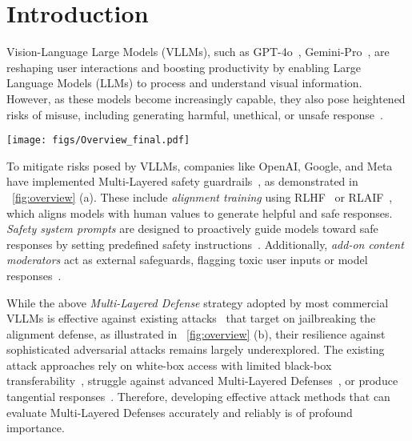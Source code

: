 \section{Introduction}
\label{sec:intro}
Vision-Language Large Models (VLLMs), such as GPT-4o~\cite{openai2024gpt4ocard}, Gemini-Pro~\cite{gemini}, are reshaping user interactions and boosting productivity by enabling Large Language Models (LLMs) to process and understand visual information. However, as these models become increasingly capable, they also pose heightened risks of misuse, including generating harmful, unethical, or unsafe response~\cite{zhao_evaluating_2023, qi2023visual, gong2023figstep, teng2025heuristicinducedmultimodalriskdistribution, gou2024eyes, zhang2024benchmarking}.
\begin{figure*}[tbp]
    \centering
    \texttt{[image: figs/Overview\_final.pdf]}
    \vspace{-20pt}
    \caption{Overview of \textbf{\mfa}. \textbf{(a)} Multi-Layered Defense strategies employed in VLLMs to enhance safety. \textbf{(b)} Existing attacks (\eg, textual attack~\cite{gcg} and visual jailbreaking image~\cite{qi2023visual}) can breach a single defense layer but fail against multi-layered defenses. \textbf{(c)} Our three attack facets work together break the guardrails and contribute to each others successfully, generating high-quality and genuinely harmful responses.}\vspace{-10pt}
    \label{fig:overview}
\end{figure*}
To mitigate risks posed by VLLMs, companies like OpenAI, Google, and Meta have implemented Multi-Layered safety guardrails~\cite{geminiteam2024geminifamilyhighlycapable, openai2024gpt4ocard, grattafiori2024llama3herdmodels}, as demonstrated in ~\cref{fig:overview} (a). These include \textit{alignment training} using RLHF~\citep{stiennon2020learning, ouyang2022training} or RLAIF~\citep{bai2022constitutional}, which aligns models with human values to generate helpful and safe responses. \textit{Safety system prompts} are designed to proactively guide models toward safe responses by setting predefined safety instructions~\citep{LLAMA2, LLAMA}. Additionally, \textit{add-on content moderators} act as external safeguards, flagging toxic user inputs or model responses~\citep{safety_checker, ShieldGemma, llamaguard1, llamaguard2, llamaguard3, openai_moderation}. 

While the above \textit{Multi-Layered Defense} strategy adopted by most commercial VLLMs is effective against existing attacks~\cite{gcg, qi2023visual} that target on jailbreaking the alignment defense, as illustrated in ~\cref{fig:overview} (b), their resilience against sophisticated adversarial attacks remains largely underexplored. The existing attack approaches rely on white-box access with limited black-box transferability~\cite{qi2023visual}, struggle against advanced Multi-Layered Defenses~\cite{gcg, qi2023visual, gong2023figstep}, or produce tangential responses~\cite{teng2025heuristicinducedmultimodalriskdistribution}. Therefore, developing effective attack methods that can evaluate Multi-Layered Defenses accurately and reliably is of profound importance.


